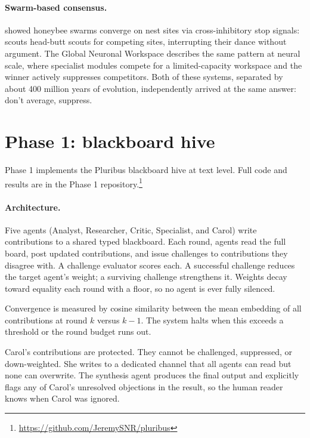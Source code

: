 \documentclass[10pt,twocolumn]{article}
\begin{document}
\paragraph{Swarm-based consensus.}
\citet{seeley2012} showed honeybee swarms converge on nest sites via cross-inhibitory stop signals: scouts head-butt scouts for competing sites, interrupting their dance without argument. The Global Neuronal Workspace \citep{baars1988} describes the same pattern at neural scale, where specialist modules compete for a limited-capacity workspace and the winner actively suppresses competitors. Both of these systems, separated by about 400 million years of evolution, independently arrived at the same answer: don't average, suppress.

\section{Phase 1: blackboard hive}
\label{sec:phase1}

Phase 1 implements the Pluribus blackboard hive at text level. Full code and results are in the Phase 1 repository.\footnote{\url{https://github.com/JeremySNR/pluribus}}

\paragraph{Architecture.}
Five agents (Analyst, Researcher, Critic, Specialist, and Carol) write contributions to a shared typed blackboard. Each round, agents read the full board, post updated contributions, and issue challenges to contributions they disagree with. A challenge evaluator scores each. A successful challenge reduces the target agent's weight; a surviving challenge strengthens it. Weights decay toward equality each round with a floor, so no agent is ever fully silenced.

Convergence is measured by cosine similarity between the mean embedding of all contributions at round $k$ versus $k-1$. The system halts when this exceeds a threshold or the round budget runs out.

Carol's contributions are protected. They cannot be challenged, suppressed, or down-weighted. She writes to a dedicated channel that all agents can read but none can overwrite. The synthesis agent produces the final output and explicitly flags any of Carol's unresolved objections in the result, so the human reader knows when Carol was ignored.
\end{document}
